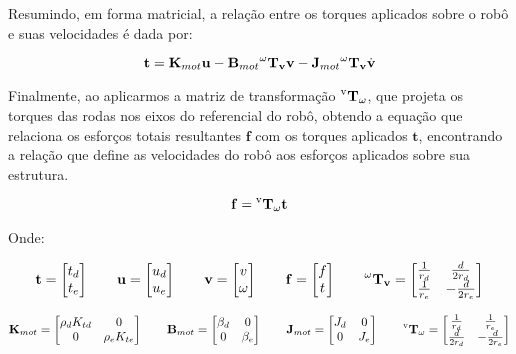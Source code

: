 Resumindo, em forma matricial, 
a relação entre os torques aplicados sobre o robô
e suas velocidades é dada por:

\begin{equation}
\mathbf{t}
=
\mathbf{K}_{mot} \mathbf{u}
-
\mathbf{B}_{mot} \mathbf{\prescript{\omega}{}{T_v}} \mathbf{v}
-
\mathbf{J}_{mot} \mathbf{\prescript{\omega}{}{T_v}} \dot{\mathbf{v}}
\label{eq:force_torque}
\end{equation}

Finalmente, ao aplicarmos a matriz de transformação $\mathbf{\prescript{\text{v}}{}{T_{\omega}}}$, 
que projeta os torques das rodas nos eixos do referencial do robô, obtendo
 a equação que relaciona os esforços totais resultantes 
$\mathbf{f}$ com os torques aplicados $\mathbf{t}$, 
encontrando a relação que define as velocidades do robô aos esforços aplicados sobre sua estrutura.

\begin{equation}
\mathbf{f}
=
\mathbf{\prescript{\text{v}}{}{T_{\omega}}} \mathbf{t}
\end{equation}

Onde:

\[
\mathbf{t} =
\begin{bmatrix}
t_d \\
t_e
\end{bmatrix}
\qquad
\mathbf{u} =
\begin{bmatrix}
u_d \\
u_e
\end{bmatrix}
\qquad
\mathbf{v} =
\begin{bmatrix}
v \\
\omega
\end{bmatrix}
\qquad
\mathbf{f} =
\begin{bmatrix}
f \\
t
\end{bmatrix}
\qquad
\mathbf{\prescript{\omega}{}{T_v}} =
\begin{bmatrix}
\frac{1}{r_d} & \frac{d}{2r_d} \\
\frac{1}{r_e} & -\frac{d}{2r_e}
\end{bmatrix}
\]

\[
\mathbf{K}_{mot} =
\begin{bmatrix}
\rho_d K_{t d} & 0 \\
0 & \rho_e K_{t e}
\end{bmatrix}
\qquad
\mathbf{B}_{mot} =
\begin{bmatrix}
\beta_d & 0 \\
0 & \beta_e
\end{bmatrix}
\qquad
\mathbf{J}_{mot} =
\begin{bmatrix}
J_d & 0 \\
0 & J_e
\end{bmatrix}
\qquad
\mathbf{\prescript{\text{v}}{}{T_{\omega}}} =
\begin{bmatrix}
\frac{1}{r_d} & \frac{1}{r_e} \\
\frac{d}{2r_d} & -\frac{d}{2r_e}
\end{bmatrix}
\]

